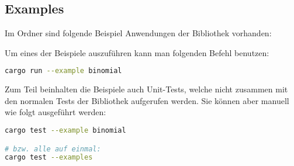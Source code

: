 \subsection{Examples}
Im Ordner  sind folgende Beispiel Anwendungen der Bibliothek vorhanden:

\begin{minipage}{10cm}
\end{minipage}

Um eines der Beispiele auszuführen kann man folgenden Befehl benutzen:

\begin{lstlisting}[language=bash]
cargo run --example binomial
\end{lstlisting}

Zum Teil beinhalten die Beispiele auch Unit-Tests, welche nicht zusammen mit den normalen Tests der Bibliothek aufgerufen werden. Sie können aber manuell wie folgt ausgeführt werden:

\begin{lstlisting}[language=bash]
cargo test --example binomial

# bzw. alle auf einmal:
cargo test --examples
\end{lstlisting}